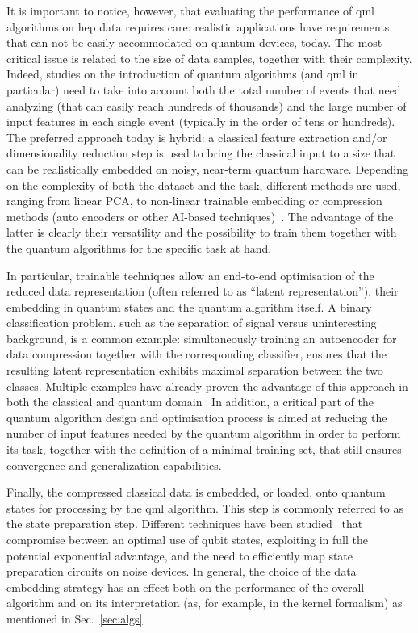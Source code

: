 It is important to notice, however, that evaluating the performance of \gls{qml} algorithms on \gls{hep} data requires care: realistic applications have requirements that can not be easily accommodated on quantum devices, today.
The most critical issue is related to the size of data samples, together with their complexity.
Indeed, studies on the introduction of quantum algorithms (and \gls{qml} in particular) need to take into account both the total number of events that need analyzing (that can easily reach hundreds of thousands) and the large number of input features in each single event (typically in the order of tens or hundreds). The preferred approach today is hybrid:  a classical feature extraction and/or dimensionality reduction step is used to bring the classical input to a size that can be realistically embedded on 
noisy, near-term quantum hardware. 
Depending on the complexity of both the dataset and the task,  different methods are used, ranging from linear PCA, to non-linear  trainable embedding or compression methods (auto encoders or other AI-based techniques)~\cite{albertsson2019machine}. The advantage of the latter is clearly their versatility and the possibility to train them together with the quantum algorithms for the specific task at hand.

In particular, trainable techniques allow an end-to-end optimisation of the reduced data representation (often referred to as “latent representation”), their embedding in quantum states and the quantum algorithm itself. A binary classification problem, such as the separation of  signal versus uninteresting background, is a common example: simultaneously training an autoencoder for data compression together with the corresponding classifier, ensures that the resulting latent representation exhibits maximal separation between the two classes.
Multiple examples have already proven the advantage of this approach in both the classical and quantum domain~\cite{collins2022machinelearning, Farina_2020, Cheng_2023, QADCERN, wozniak2023quantum,belis2021higgs}
In addition, a critical part of the quantum algorithm design and optimisation process is  aimed at reducing the number of input features needed by the quantum algorithm in order to perform its task, together with the definition of a minimal training set, that still ensures convergence and generalization capabilities. 

Finally, the compressed classical data is embedded, or loaded, onto quantum states for processing by the \gls{qml} algorithm. This step is commonly referred to as the state preparation step.  Different  techniques have been studied~\cite{lloyd2020quantum} that compromise between an optimal use of qubit states, exploiting in full the potential exponential advantage, and the need to efficiently map state preparation circuits on %
noise devices. In general, the choice of the data embedding strategy has an effect both on the performance of the overall algorithm and on its interpretation (as, for example, in the kernel formalism) as mentioned in Sec.~\ref{sec:algs}.

